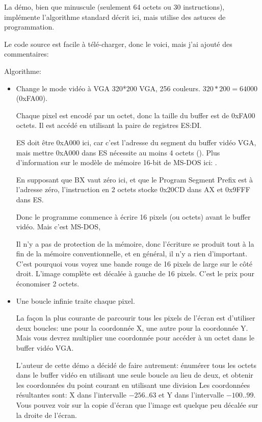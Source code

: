 La démo, bien que minuscule (seulement 64 octets ou 30 instructions), implémente
l'algorithme standard décrit ici, mais utilise des astuces de programmation.

%
Le code source est facile à télé-charger, donc le voici, mais j'ai ajouté des commentaires:



Algorithme:

\begin{itemize}
\item Change le mode vidéo à VGA 320*200 VGA, 256 couleurs. 
$320*200=64000$ (0xFA00). 

Chaque pixel est encodé par un octet, donc la taille du buffer est de 0xFA00 octets.
Il est accédé en utilisant la paire de registres ES:DI.

ES doit être 0xA000 ici, car c'est l'adresse du segment du buffer vidéo VGA, mais
mettre 0xA000 dans ES nécessite au moins 4 octets ().
Plus d'information sur le modèle de mémoire 16-bit de MS-DOS ici:
.


En supposant que BX vaut zéro ici, et que le Program Segment Prefix est à l'adresse
zéro, l'instruction en 2 octets  stocke 0x20CD dans AX et 0x9FFF
dans ES.

Donc le programme commence à écrire 16 pixels (ou octets) avant le buffer vidéo.
Mais c'est MS-DOS,

Il n'y a pas de protection de la mémoire, donc l'écriture se produit tout à la fin
de la mémoire conventionnelle, et en général, il n'y a rien d'important.
C'est pourquoi vous voyez une bande rouge de 16 pixels de large sur le côté droit.
L'image complète est décalée à gauche de 16 pixels.
C'est le prix pour économiser 2 octets.

\item Une boucle infinie traite chaque pixel.

La façon la plus courante de parcourir tous les pixels de l'écran est d'utiliser deux boucles:
une pour la coordonnée X, une autre pour la coordonnée Y.
Mais vous devrez multiplier une coordonnée pour accéder à un octet dans le buffer vidéo VGA.

L'auteur de cette démo a décidé de faire autrement: énumérer tous les octets dans
le buffer vidéo en utilisant une seule boucle au lieu de deux, et obtenir les coordonnées
du point courant en utilisant une division
Les coordonnées résultantes sont: X dans l'intervalle $-256..63$ et Y dans l'intervalle
$-100..99$.
Vous pouvez voir sur la copie d'écran que l'image est quelque peu décalée sur la
droite de l'écran.


\end{itemize}
